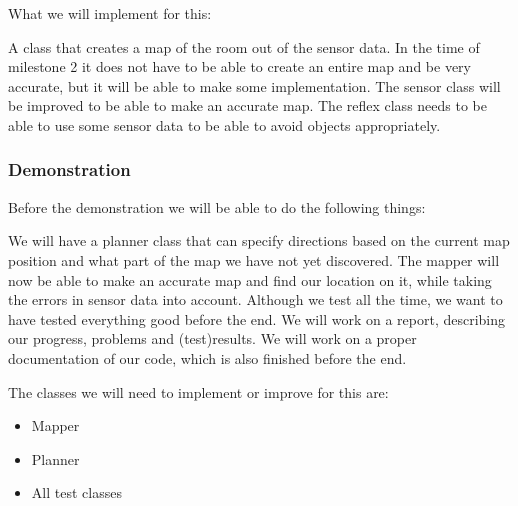 What we will implement for this:
\begin{itemize}
 A class that creates a map of the room out of the sensor
data. In the time of milestone 2 it does not have to be able to create an entire
map and be very accurate, but it will be able to make some implementation.
 The sensor class will be improved to be able to make
an accurate map.
 The reflex class needs to be able to use some
sensor data to be able to avoid objects appropriately. 
\end{itemize}


\subsubsection*{Demonstration}
Before the demonstration we will be able to do the following things:
\begin{itemize}
 We will have a planner class that can specify directions
based on the current map position and what part of the map we have not yet
discovered.
 The mapper will now be able to make an accurate map
and find our location on it, while taking the errors in sensor data into account.
 Although we test all the time, we want to have tested
everything good before the end.
 We will work on a report, describing our progress, problems
and (test)results.
 We will work on a proper documentation of our code,
which is also finished before the end.
\end{itemize}

The classes we will need to implement or improve for this are:
\begin{itemize}
\item Mapper
\item Planner
\item All test classes
\end{itemize}
